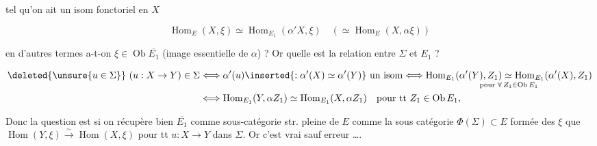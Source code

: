 
tel qu'on ait un isom fonctoriel en $X$

\[\operatorname{Hom}_{E}(X,\xi)\simeq\operatorname{Hom}_{E_1}(\alpha'X,\xi)\quad(\simeq\operatorname{Hom}_{E}(X,\alpha\xi))\]

en d'autres termes a-t-on $\xi\in\operatorname{Ob}\overline{E_1}$ (image essentielle de $\alpha$) ? Or quelle est la relation entre $\Sigma$ et $E_1$ ?

\[
\begin{aligned}
\deleted{\unsure{u\in\Sigma}}\ (u:X\to Y)\in\Sigma
&\Longleftrightarrow\alpha'(u)\inserted{:\alpha'(X)\simeq\alpha'(Y)}\ \text{un isom}
\Longleftrightarrow\underset{\text{pour }\forall\, Z_1\in\operatorname{Ob}E_1}{\operatorname{Hom}_{E_1}(\alpha'(Y),Z_1)\simeq\operatorname{Hom}_{E_1}(\alpha'(X),Z_1)}\\
&\Longleftrightarrow\operatorname{Hom}_{E_1}(Y,\alpha Z_1)\simeq\operatorname{Hom}_{E_1}(X,\alpha Z_1)\quad\text{pour tt } Z_1\in\operatorname{Ob}E_1,
\end{aligned}
\]

Donc la question est si on récupère bien $\overline{E_1}$ comme sous-catégorie str. pleine de $E$ comme la sous catégorie   $\Phi(\Sigma)\subset E$ formée des $\xi$  que $\operatorname{Hom}(Y,\xi)\xrightarrow{\sim}\operatorname{Hom}(X,\xi)$ pour tt $u:X\to Y$ dans $\Sigma$. Or c'est vrai sauf erreur \ldots.

